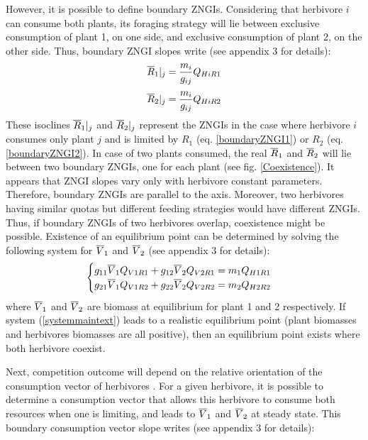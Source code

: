 \documentclass[12pt]{article}
\newcommand\barre[1]{\overline{\rule{0pt}{1.5ex}#1}}
\begin{document}
However, it is possible to define boundary ZNGIs. Considering that herbivore $i$ can consume both plants, its foraging strategy will lie between exclusive consumption of plant 1, on one side, and exclusive consumption of plant 2, on the other side. Thus, boundary ZNGI slopes write (see appendix 3 for details):
\begin{equation}\label{boundaryZNGI1}
\barre{R}_1|_j=\frac{m_i}{g_{ij}}Q_{HiR1}
\end{equation}
\begin{equation}\label{boundaryZNGI2}
\barre{R}_2|_j=\frac{m_i}{g_{ij}}Q_{HiR2}
\end{equation}
These isoclines $\barre{R}_1|_j$ and $\barre{R}_2|_j$ represent the ZNGIs in the case where herbivore $i$ consumes only plant $j$ and is limited by $R_1$ (eq. \ref{boundaryZNGI1}) or $R_2$ (eq. \ref{boundaryZNGI2}). In case of two plants consumed, the real $\barre{R}_1$ and $\barre{R}_2$ will lie between two boundary ZNGIs, one for each plant (see fig. \ref{Coexistence}).
It appears that ZNGI slopes vary only with herbivore constant parameters. Therefore, boundary ZNGIs are parallel to the axis. Moreover, two herbivores having similar quotas but different feeding strategies would have different ZNGIs. Thus, if boundary ZNGIs of two herbivores overlap, coexistence might be possible. Existence of an equilibrium point can be determined by solving the following system for $\barre{V}_1$ and $\barre{V}_2$ (see appendix 3 for details):
\begin{equation} \label{systemmaintext}
\begin{cases}
g_{11}\barre{V}_1 Q_{V1R1}+g_{12}\barre{V}_2 Q_{V2R1}=m_1 Q_{H1R1} \\
g_{21}\barre{V}_1 Q_{V1R2}+g_{22}\barre{V}_2 Q_{V2R2}=m_2 Q_{H2R2}
\end{cases} 
\end{equation}
where $\barre{V}_1$ and $\barre{V}_2$ are biomass at equilibrium for plant 1 and 2 respectively. If system (\ref{systemmaintext}) leads to a realistic equilibrium point (plant biomasses and herbivores biomasses are all positive), then an equilibrium point exists where both herbivore coexist. 
\par
Next, competition outcome will depend on the relative orientation of the consumption vector of herbivores \citep{Tilman1980}. For a given herbivore, it is possible to determine a consumption vector that allows this herbivore to consume both resources when one is limiting, and leads to $\barre{V}_1$ and $\barre{V}_2$ at steady state. This boundary consumption vector slope writes (see appendix 3 for details):
\end{document}
